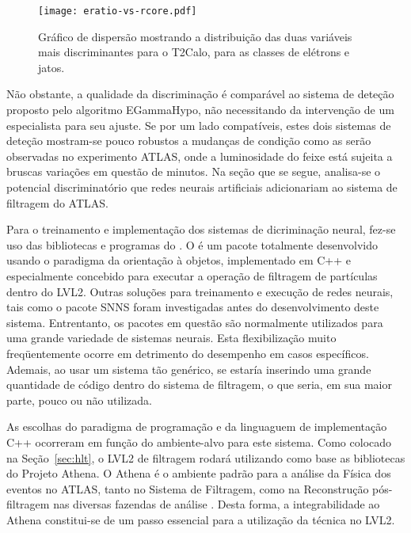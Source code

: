 \begin{figure}
\begin{center}
\texttt{[image: eratio-vs-rcore.pdf]}
\end{center}
\caption{Gráfico de dispersão mostrando a distribuição das duas variáveis mais
discriminantes para o T2Calo, para as classes de elétrons e jatos.}
\label{fig:eratio-vs-rcore}
\end{figure}

Não obstante, a qualidade da discriminação é comparável ao sistema de deteção
proposto pelo algoritmo EGammaHypo, não necessitando da intervenção de um
especialista para seu ajuste. Se por um lado compatíveis, estes dois sistemas
de deteção mostram-se pouco robustos a mudanças de condição como as serão
observadas no experimento ATLAS, onde a luminosidade do feixe está sujeita a
bruscas variações em questão de minutos. Na seção que se segue, analisa-se o
potencial discriminatório que redes neurais artificiais adicionariam ao
sistema de filtragem do ATLAS.

Para o treinamento e implementação dos sistemas de dicriminação neural, fez-se
uso das bibliotecas e programas do . O  é
um pacote totalmente desenvolvido usando o paradigma da orientação à objetos,
implementado em C++ \cite{stroustrup} e especialmente concebido para executar
a operação de filtragem de partículas dentro do LVL2. Outras soluções para
treinamento e execução de redes neurais, tais como o pacote SNNS \cite{snns}
foram investigadas antes do desenvolvimento deste sistema. Entrentanto, os
pacotes em questão são normalmente utilizados para uma grande variedade de
sistemas neurais. Esta flexibilização muito freqüentemente ocorre em
detrimento do desempenho em casos específicos. Ademais, ao usar um sistema tão
genérico, se estaría inserindo uma grande quantidade de código dentro do
sistema de filtragem, o que seria, em sua maior parte, pouco ou não utilizada.

As escolhas do paradigma de programação e da linguaguem de implementação C++
ocorreram em função do ambiente-alvo para este sistema. Como colocado na
Seção~\ref{sec:hlt}, o LVL2 de filtragem rodará utilizando como base as
bibliotecas do Projeto Athena. O Athena é o ambiente padrão para a análise da
Física dos eventos no ATLAS, tanto no Sistema de Filtragem, como na
Reconstrução pós-filtragem nas diversas fazendas de análise
. Desta forma, a integrabilidade ao Athena constitui-se de um
passo essencial para a utilização da técnica no LVL2. 

